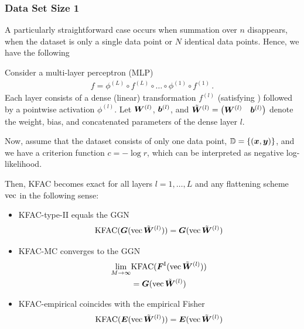 \switchcolumn[1]
\switchcolumn[0]

\subsubsection{Data Set Size 1}
A particularly straightforward case occurs when summation over $n$ disappears, \ie when the dataset is only a single data point or $N$ identical data points.
Hence, we have the following

\begin{test}\label{test:kfac_expand_linear_no_weight_sharing_batch_size_1}
  Consider a multi-layer perceptron (MLP)
  \begin{align*}
    f = \phi^{(L)} \circ f^{(L)} \circ \ldots \circ \phi^{(1)} \circ f^{(1)}\,.
  \end{align*}
  Each layer consists of a dense (linear) transformation $f^{(l)}$ (satisfying ) followed by a pointwise activation $\phi^{(l)}$.
  Let $\mW^{(l)}$, $\vb^{(l)}$, and $\tilde{\mW}^{(l)} = \begin{pmatrix} \mW^{(l)} & \vb^{(l)} \end{pmatrix}$ denote the weight, bias, and concatenated parameters of the dense layer $l$.

  Now, assume that the dataset consists of only one data point, $\sD = \{ (\vx, \vy) \}$, and we have a criterion function $c = - \log r$, which can be interpreted as negative log-likelihood.

  Then, KFAC becomes exact for all layers $l = 1, \dots, L$ and any flattening scheme $\vec$ in the following sense:
  \begin{itemize}[leftmargin=0.5cm]
  \item KFAC-type-II equals the GGN
    \begin{align*}
      \kfac(\mG(\vec \tilde{\mW}^{(l)})) = \mG(\vec \tilde{\mW}^{(l)})
    \end{align*}
  \item KFAC-MC converges to the GGN
    \begin{align*}
      \lim_{M \to \infty} &\kfac(\mF^{\text{I}}(\vec\tilde{\mW}^{(l)}))
      \\
                          &= \mG(\vec \tilde{\mW}^{(l)})
    \end{align*}
  \item KFAC-empirical coincides with the empirical Fisher
    \begin{align*}
      \kfac(\mE(\vec\tilde{\mW}^{(l)})) = \mE(\vec \tilde{\mW}^{(l)})
    \end{align*}
  \end{itemize}
\end{test}

